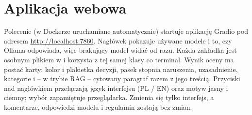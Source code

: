 \newpage
\section{Aplikacja webowa}
\label{sec:aplikacja}

Polecenie  (w Dockerze uruchamiane automatycznie) startuje aplikację Gradio pod adresem
\url{http://localhost:7860}. Nagłówek pokazuje używane modele i to, czy Ollama odpowiada, więc brakujący model widać
od razu. Każda zakładka jest osobnym plikiem w  i korzysta z tej samej klasy
 co terminal. Wynik oceny ma postać karty: kolor i plakietka decyzji, pasek stopnia naruszenia,
uzasadnienie, kategorie i -- w trybie RAG -- cytowany paragraf razem z jego treścią. Przyciski nad nagłówkiem
przełączają język interfejsu (PL / EN) oraz motyw jasny i ciemny; wybór zapamiętuje przeglądarka. Zmienia się tylko
interfejs, a komentarze, odpowiedzi modelu i regulamin zostają bez zmian.






